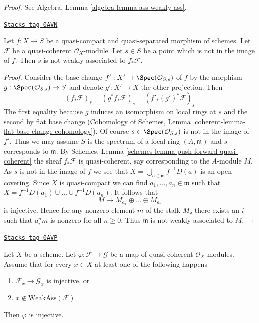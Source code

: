 \begin{proof}
See
Algebra, Lemma \ref{algebra-lemma-ass-weakly-ass}.
\end{proof}

\begin{lemma}
\label{divisors-lemma-weakass-pushforward}
\href{https://stacks.math.columbia.edu/tag/0AVN}{\texttt{Stacks tag 0AVN}}

Let $f : X \to S$ be a quasi-compact and quasi-separated morphism of schemes.
Let $\mathcal{F}$ be a quasi-coherent $\mathcal{O}_X$-module.
Let $s \in S$ be a point which is not in the image of $f$. Then
$s$ is not weakly associated to $f_*\mathcal{F}$.
\end{lemma}

\begin{proof}
Consider the base change $f' : X' \to \Spec(\mathcal{O}_{S, s})$
of $f$ by the morphism $g : \Spec(\mathcal{O}_{S, s}) \to S$
and denote $g' : X' \to X$ the other projection.
Then
$$
(f_*\mathcal{F})_s = (g^*f_*\mathcal{F})_s = (f'_*(g')^*\mathcal{F})_s
$$
The first equality because $g$ induces an isomorphism on local
rings at $s$ and the second by flat base change (Cohomology of Schemes, Lemma
\ref{coherent-lemma-flat-base-change-cohomology}). Of course
$s \in \Spec(\mathcal{O}_{S, s})$ is not in the image of $f'$.
Thus we may assume $S$ is the spectrum of a local ring
$(A, \mathfrak m)$ and $s$ corresponds to $\mathfrak m$.
By Schemes, Lemma \ref{schemes-lemma-push-forward-quasi-coherent}
the sheaf $f_*\mathcal{F}$ is quasi-coherent, say corresponding
to the $A$-module $M$. As $s$ is not in the image of $f$ we see that
$X = \bigcup_{a \in \mathfrak m} f^{-1}D(a)$ is an open covering.
Since $X$ is quasi-compact we can find $a_1, \ldots, a_n \in \mathfrak m$
such that $X = f^{-1}D(a_1) \cup \ldots \cup f^{-1}D(a_n)$. It follows
that
$$
M \to M_{a_1} \oplus \ldots \oplus M_{a_r}
$$
is injective. Hence for any nonzero element $m$ of the stalk $M_\mathfrak p$
there exists an $i$ such that $a_i^n m$ is nonzero for all $n \geq 0$.
Thus $\mathfrak m$ is not weakly associated to $M$.
\end{proof}

\begin{lemma}
\label{divisors-lemma-check-injective-on-weakass}
\href{https://stacks.math.columbia.edu/tag/0AVP}{\texttt{Stacks tag 0AVP}}

Let $X$ be a scheme. Let $\varphi : \mathcal{F} \to \mathcal{G}$ be a map of
quasi-coherent $\mathcal{O}_X$-modules. Assume that for every $x \in X$
at least one of the following happens
\begin{enumerate}
\item $\mathcal{F}_x \to \mathcal{G}_x$ is injective, or
\item $x \not \in \text{WeakAss}(\mathcal{F})$.
\end{enumerate}
Then $\varphi$ is injective.
\end{lemma}

